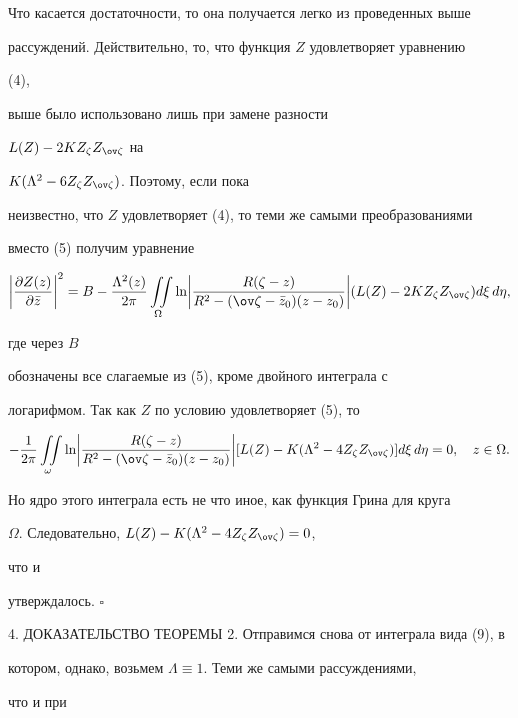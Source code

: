  


Что касается достаточности, то она получается легко из проведенных выше 


рассуждений. Действительно, то, что функция $Z$ удовлетворяет уравнению 


(4), 


выше было использовано лишь при замене разности 


$L(Z)-2KZ_\zeta Z_{\ov\zeta}$ на 


$K(\Lambda^2-6Z_\zeta Z_{\ov\zeta})$. Поэтому, если пока 


неизвестно, что $Z$ удовлетворяет (4), то теми же самыми преобразованиями 


вместо (5) получим уравнение 


$$ 


\biggl|\frac{\partial Z(z)}{\partial\Bar z}\biggr|^2= B- 


\frac{\Lambda^2(z)}{2\pi}\iintl_\Omega\ln\biggl| 


\frac{R(\zeta-z)}{R^2-(\ov\zeta-\Bar z_0)(z-z_0)}\biggr| 


(L(Z)-2KZ_\zeta Z_{\ov\zeta})d\xi\,d\eta, 


$$ 


где через $B$ 


обозначены все слагаемые из (5), кроме двойного интеграла с 


логарифмом. Так как $Z$ по условию удовлетворяет (5), то 


$$ 


-\frac{1}{2\pi}\iintl_\omega\ln\biggl|


\frac{R(\zeta-z)}{R^2-(\ov\zeta-\Bar z_0)(z-z_0)}\biggr| 


[L(Z)-K(\Lambda^2-4Z_\zeta Z_{\ov\zeta})]d\xi\,d\eta=0, 


\quad z\in\Omega. 


$$ 


Но ядро этого интеграла есть не что иное, как функция Грина для круга 


$\Omega$. Следовательно, $L(Z)-K(\Lambda^2-4Z_\zeta Z_{\ov\zeta})=0$, 


что и 


утверждалось. $\square$ 


 


4. ДОКАЗАТЕЛЬСТВО ТЕОРЕМЫ 2. Отправимся снова от интеграла вида (9), в 


котором, однако, возьмем $\Lambda\equiv 1$. Теми же самыми рассуждениями, 


что и при 


